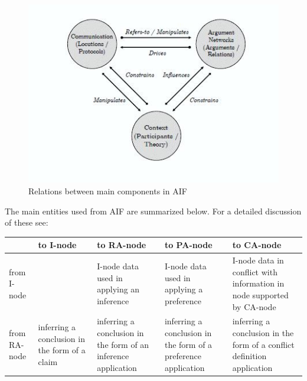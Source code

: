 \begin{figure}[tbh]
\centering
\includegraphics{aifs1.jpg}
\caption{Relations between main components in AIF}
\label{fig:aif1}
\end{figure}

The main entities used from AIF are summarized below. For a detailed discussion of these see\cite{aif}:
\begin{table}[tbh]
\centering
\begin{tabular}{|p{2.3cm}|p{2.3cm}|p{2.3cm}|p{2.3cm}|p{2.3cm}|}
\hline
&to I-node & to RA-node & to PA-node & to CA-node\\
\hline
from I-node & & I-node data used in applying an inference & I-node data used in applying a preference & I-node data in conflict with information in node supported by CA-node\\
from RA-node & inferring a conclusion in the form of a claim & inferring a conclusion in the form of an inference application & inferring a conclusion in the form of a preference application & inferring a conclusion in the form of a conflict definition application\\
\hline
\end{tabular}
\label{tab:aif}
\end{table}
